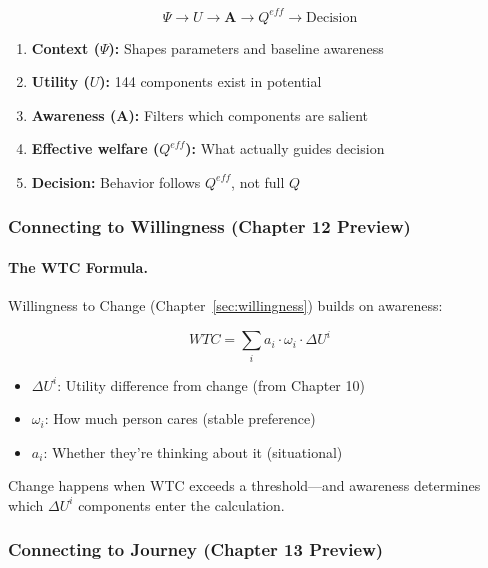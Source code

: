 \begin{equation}
\Psi \rightarrow U \rightarrow \mathbf{A} \rightarrow Q^{eff} \rightarrow \text{Decision}
\end{equation}

\begin{enumerate}
\item \textbf{Context ($\Psi$):} Shapes parameters and baseline awareness
\item \textbf{Utility ($U$):} 144 components exist in potential
\item \textbf{Awareness ($\mathbf{A}$):} Filters which components are salient
\item \textbf{Effective welfare ($Q^{eff}$):} What actually guides decision
\item \textbf{Decision:} Behavior follows $Q^{eff}$, not full $Q$
\end{enumerate}

\subsubsection{Connecting to Willingness (Chapter 12 Preview)}

\paragraph{The WTC Formula.}
Willingness to Change (Chapter~\ref{sec:willingness}) builds on awareness:

\begin{equation}
WTC = \sum_{i} a_i \cdot \omega_i \cdot \Delta U^i
\end{equation}

\begin{itemize}
\item $\Delta U^i$: Utility difference from change (from Chapter 10)
\item $\omega_i$: How much person cares (stable preference)
\item $a_i$: Whether they're thinking about it (situational)
\end{itemize}

Change happens when WTC exceeds a threshold---and awareness determines 
which $\Delta U^i$ components enter the calculation.

\subsubsection{Connecting to Journey (Chapter 13 Preview)}

